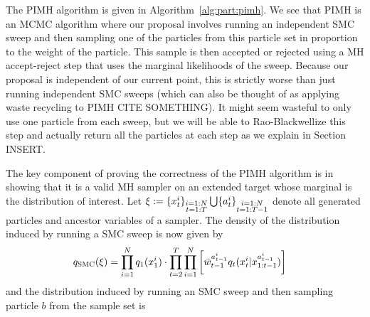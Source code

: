 The PIMH algorithm is given in Algorithm~\ref{alg:part:pimh}.  We see that PIMH is an MCMC
algorithm where our proposal involves running an independent SMC
sweep and then sampling one of the particles from this particle set in proportion to
the weight of the particle.  This sample is then accepted or rejected using a MH accept-reject
step that  uses the marginal likelihoods of the sweep.  Because our proposal
is independent of our current point, this is strictly worse than just running independent SMC sweeps
(which can also be thought of as applying waste recycling to PIMH CITE SOMETHING).  
It might seem wasteful to only use
one particle from each sweep, but we will be able to Rao-Blackwellize this step and actually
return all the particles at each step as we explain in Section INSERT. 

The key component of proving the correctness of the PIMH algorithm is in showing that it is a valid
MH sampler on an extended target whose marginal is the distribution of interest.
Let $\mathbf{\xi} := \{x_{t}^i\}_{\substack{i=1:N\\t=1:T}} \bigcup \{a_{t}^i\}_{\substack{i=1:N\\t=1:T-1}}$
denote all generated particles and ancestor variables of a \smc sampler.  The density of the distribution induced
by running a SMC sweep is now given by
\begin{align}
\label{eq:part:smc:proposal}
q_{\text{SMC}}(\mathbf{\xi}) &= \prod_{i=1}^N q_1(x_{1}^i) \cdot \prod_{t=2}^T \prod_{i=1}^N \left[ 
\bar w_{t-1}^{a_{t-1}^i}
q_t(x_{t}^i|x_{1:t-1}^{a_{t-1}^i}) \right]
\end{align}
and the distribution induced by running an SMC sweep and then sampling particle $b$ from the
sample set is 
